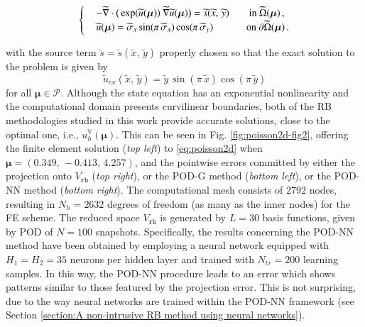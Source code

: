 \documentclass[longtitle]{elsarticle}
\numberwithin{equation}{section}
\theoremstyle{theorem}
\theoremstyle{definition}
\theoremstyle{remark}
\theoremstyle{proposition}
\numberwithin{figure}{section}
\newcommand{\wt}[1]{\widetilde{#1}}
\newcommand{\bg}[1]{\boldsymbol{#1}}
\begin{document}
		\begin{linenomath}\begin{linenomath}\begin{equation}
			\label{eq:poisson2d}
			\begin{cases}
				& - \wt{\nabla} \cdot \big( \exp(\wt{u}(\bg{\mu})) ~ \wt{\nabla} \wt{u}(\bg{\mu}) \big) = \wt{s}(\wt{x}, \, \wt{y}) \hspace*{20pt} \text{in $\wt{\Omega}(\bg{\mu})$} \, , \\
				& \wt{u}(\bg{\mu}) = \wt{\sigma}_x \sin(\pi \, \wt{\sigma}_x) \cos(\pi \, \wt{\sigma}_y) \hspace*{33.5pt} \text{on $\partial \wt{\Omega}(\bg{\mu})$} \, .
			\end{cases}
		\end{equation}\end{linenomath}\end{linenomath}
		with the source term $\wt{s} = \wt{s}(\wt{x}, \, \wt{y})$ properly chosen so that the exact solution to the problem is given by \[ \wt{u}_{ex}(\wt{x}, \, \wt{y}) = \wt{y} \, \sin(\pi \, \wt{x}) \cos(\pi \, \wt{y}) \] for all $\bg{\mu} \in \mathcal{P}$. Although the state equation has an exponential nonlinearity and the computational domain presents curvilinear boundaries, both of the RB methodologies studied in this work provide accurate solutions, close to the optimal one, i.e., $u_h^{\mathbb{V}}(\bg{\mu})$.	This can be seen in Fig. \ref{fig:poisson2d-fig2}, offering the finite element solution (\emph{top left}) to \eqref{eq:poisson2d} when $\bg{\mu} = (0.349, \, -0.413, \, 4.257)$, and the pointwise errors committed by either the projection onto $V_{\texttt{rb}}$ (\emph{top right}), or the POD-G method (\emph{bottom left}), or the POD-NN method (\emph{bottom right}). The computational mesh consists of $2792$ nodes, resulting in $N_h = 2632$ degrees of freedom (as many as the inner nodes) for the FE scheme. The reduced space $V_{\texttt{rb}}$ is generated by $L = 30$ basis functions, given by POD of $N = 100$ snapshots. Specifically, the results concerning the POD-NN method have been obtained by employing a neural network equipped with $H_1 = H_2 = 35$ neurons per hidden layer and trained with $N_{tr} = 200$ learning samples. In this way, the POD-NN procedure leads to an error which shows patterns similar to those featured by the projection error. This is not surprising, due to the way neural networks are trained within the POD-NN framework (see Section \ref{section:A non-intrusive RB method using neural networks}). 
		
\end{document}
